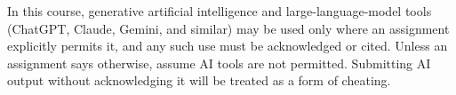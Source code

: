 In this course, generative artificial intelligence and large-language-model
tools (ChatGPT, Claude, Gemini, and similar) may be used only where an
assignment explicitly permits it, and any such use must be acknowledged or
cited. Unless an assignment says otherwise, assume AI tools are not permitted.
Submitting AI output without acknowledging it will be treated as a form of
cheating.
